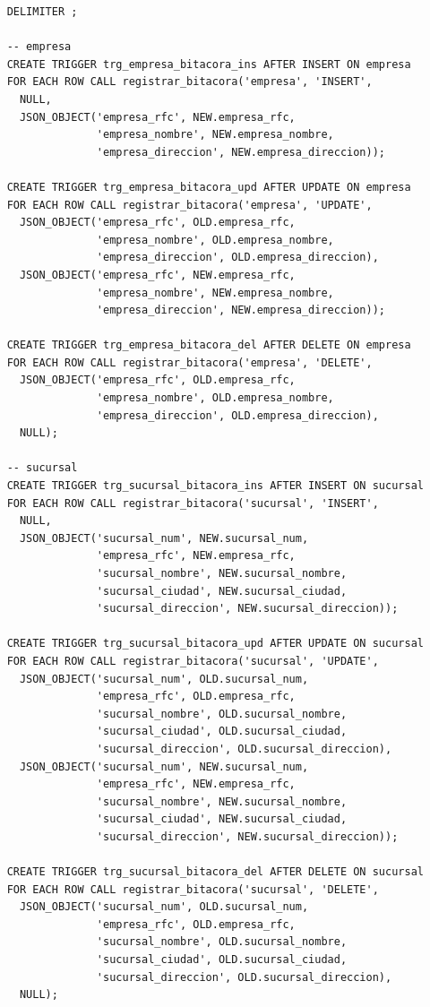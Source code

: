 \begin{verbatim}
	DELIMITER ;

	-- empresa
	CREATE TRIGGER trg_empresa_bitacora_ins AFTER INSERT ON empresa
	FOR EACH ROW CALL registrar_bitacora('empresa', 'INSERT',
	  NULL,
	  JSON_OBJECT('empresa_rfc', NEW.empresa_rfc,
	              'empresa_nombre', NEW.empresa_nombre,
	              'empresa_direccion', NEW.empresa_direccion));

	CREATE TRIGGER trg_empresa_bitacora_upd AFTER UPDATE ON empresa
	FOR EACH ROW CALL registrar_bitacora('empresa', 'UPDATE',
	  JSON_OBJECT('empresa_rfc', OLD.empresa_rfc,
	              'empresa_nombre', OLD.empresa_nombre,
	              'empresa_direccion', OLD.empresa_direccion),
	  JSON_OBJECT('empresa_rfc', NEW.empresa_rfc,
	              'empresa_nombre', NEW.empresa_nombre,
	              'empresa_direccion', NEW.empresa_direccion));

	CREATE TRIGGER trg_empresa_bitacora_del AFTER DELETE ON empresa
	FOR EACH ROW CALL registrar_bitacora('empresa', 'DELETE',
	  JSON_OBJECT('empresa_rfc', OLD.empresa_rfc,
	              'empresa_nombre', OLD.empresa_nombre,
	              'empresa_direccion', OLD.empresa_direccion),
	  NULL);

	-- sucursal
	CREATE TRIGGER trg_sucursal_bitacora_ins AFTER INSERT ON sucursal
	FOR EACH ROW CALL registrar_bitacora('sucursal', 'INSERT',
	  NULL,
	  JSON_OBJECT('sucursal_num', NEW.sucursal_num,
	              'empresa_rfc', NEW.empresa_rfc,
	              'sucursal_nombre', NEW.sucursal_nombre,
	              'sucursal_ciudad', NEW.sucursal_ciudad,
	              'sucursal_direccion', NEW.sucursal_direccion));

	CREATE TRIGGER trg_sucursal_bitacora_upd AFTER UPDATE ON sucursal
	FOR EACH ROW CALL registrar_bitacora('sucursal', 'UPDATE',
	  JSON_OBJECT('sucursal_num', OLD.sucursal_num,
	              'empresa_rfc', OLD.empresa_rfc,
	              'sucursal_nombre', OLD.sucursal_nombre,
	              'sucursal_ciudad', OLD.sucursal_ciudad,
	              'sucursal_direccion', OLD.sucursal_direccion),
	  JSON_OBJECT('sucursal_num', NEW.sucursal_num,
	              'empresa_rfc', NEW.empresa_rfc,
	              'sucursal_nombre', NEW.sucursal_nombre,
	              'sucursal_ciudad', NEW.sucursal_ciudad,
	              'sucursal_direccion', NEW.sucursal_direccion));

	CREATE TRIGGER trg_sucursal_bitacora_del AFTER DELETE ON sucursal
	FOR EACH ROW CALL registrar_bitacora('sucursal', 'DELETE',
	  JSON_OBJECT('sucursal_num', OLD.sucursal_num,
	              'empresa_rfc', OLD.empresa_rfc,
	              'sucursal_nombre', OLD.sucursal_nombre,
	              'sucursal_ciudad', OLD.sucursal_ciudad,
	              'sucursal_direccion', OLD.sucursal_direccion),
	  NULL);


\end{verbatim}
